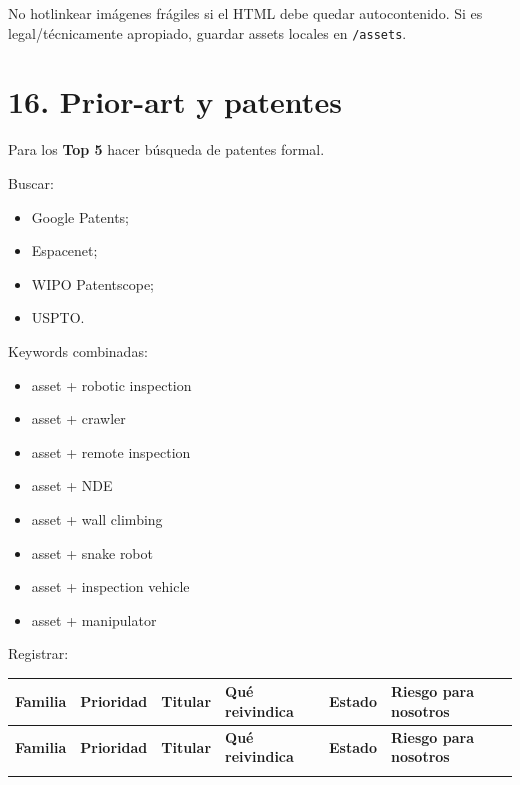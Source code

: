 \documentclass[11pt,a4paper]{article}
\newlength{\colw}
\begin{document}
No hotlinkear imágenes frágiles si el HTML debe quedar autocontenido. Si es legal/técnicamente apropiado, guardar assets locales en \texttt{/assets}.


\section*{16. Prior-art y patentes}
Para los \textbf{Top 5} hacer búsqueda de patentes formal.

Buscar:

\begin{itemize}
\item Google Patents;
\item Espacenet;
\item WIPO Patentscope;
\item USPTO.
\end{itemize}

Keywords combinadas:

\begin{itemize}
\item asset + robotic inspection
\item asset + crawler
\item asset + remote inspection
\item asset + NDE
\item asset + wall climbing
\item asset + snake robot
\item asset + inspection vehicle
\item asset + manipulator
\end{itemize}

Registrar:

\begingroup\footnotesize
\setlength{\tabcolsep}{4pt}
\setlength{\emergencystretch}{3em}
 
\setlength{\colw}{\dimexpr(\linewidth-12\tabcolsep)/6\relax}
\begin{longtable}{@{}L L L L L L@{}}
\toprule
\textbf{Familia} & \textbf{Prioridad} & \textbf{Titular} & \textbf{Qué reivindica} & \textbf{Estado} & \textbf{Riesgo para nosotros} \\
\midrule
\endfirsthead
\toprule
\textbf{Familia} & \textbf{Prioridad} & \textbf{Titular} & \textbf{Qué reivindica} & \textbf{Estado} & \textbf{Riesgo para nosotros} \\
\midrule
\endhead
\bottomrule
\endfoot
{} \\
\end{longtable}
\endgroup
\end{document}
